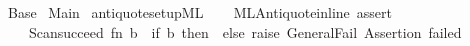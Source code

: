 %
\begin{isabellebody}%
\def\isabellecontext{Base}%
%
\isadelimtheory
%
\endisadelimtheory
%
\isatagtheory
{}\isamarkupfalse%
\ Base\isanewline
{}\ Main\isanewline
{}\ {\isachardoublequoteopen}{\isachardot}{\isachardot}{\isacharslash}{\isachardot}{\isachardot}{\isacharslash}antiquote{\isacharunderscore}setup{\isachardot}ML{\isachardoublequoteclose}\isanewline
{}%
\endisatagtheory
{\isafoldtheory}%
%
\isadelimtheory
\isanewline
%
\endisadelimtheory
\isanewline
%
\isadelimML
\isanewline
%
\endisadelimML
%
\isatagML
{}\isamarkupfalse%
\ {\isacharverbatimopen}\isanewline
\ \ ML{\isacharunderscore}Antiquote{\isachardot}inline\ {\isachardoublequote}assert{\isachardoublequote}\isanewline
\ \ \ \ {\isacharparenleft}Scan{\isachardot}succeed\ {\isachardoublequote}{\isacharparenleft}fn\ b\ {\isacharequal}{\isachargreater}\ if\ b\ then\ {\isacharparenleft}{\isacharparenright}\ else\ raise\ General{\isachardot}Fail\ {\isacharbackslash}{\isachardoublequote}Assertion\ failed{\isacharbackslash}{\isachardoublequote}{\isacharparenright}{\isachardoublequote}{\isacharparenright}\isanewline
{\isacharverbatimclose}%
\endisatagML
{\isafoldML}%
%
\isadelimML
\isanewline
%
\endisadelimML
%
\isadelimtheory
\isanewline
%
\endisadelimtheory
%
\isatagtheory
{}\isamarkupfalse%
%
\endisatagtheory
{\isafoldtheory}%
%
\isadelimtheory
\isanewline
%
\endisadelimtheory
\end{isabellebody}%
